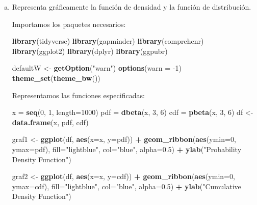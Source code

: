 \documentclass[a4paper]{article}
\newenvironment{Shaded}{\begin{snugshade}}{\end{snugshade}}
\newcommand{\DataTypeTok}[1]{\textcolor[rgb]{0.13,0.29,0.53}{#1}}
\newcommand{\DecValTok}[1]{\textcolor[rgb]{0.00,0.00,0.81}{#1}}
\newcommand{\FloatTok}[1]{\textcolor[rgb]{0.00,0.00,0.81}{#1}}
\newcommand{\KeywordTok}[1]{\textcolor[rgb]{0.13,0.29,0.53}{\textbf{#1}}}
\newcommand{\NormalTok}[1]{#1}
\newcommand{\OperatorTok}[1]{\textcolor[rgb]{0.81,0.36,0.00}{\textbf{#1}}}
\newcommand{\StringTok}[1]{\textcolor[rgb]{0.31,0.60,0.02}{#1}}
\begin{document}
\begin{enumerate}[a)]
	\item Representa gráficamente la función de densidad y la función de distribución.

	Importamos los paquetes necesarios:

\begin{Shaded}
\begin{Highlighting}[]
\KeywordTok{library}\NormalTok{(tidyverse)}
\KeywordTok{library}\NormalTok{(gapminder)}
\KeywordTok{library}\NormalTok{(comprehenr)}
\KeywordTok{library}\NormalTok{(ggplot2)}
\KeywordTok{library}\NormalTok{(dplyr)}
\KeywordTok{library}\NormalTok{(ggpubr)}

\NormalTok{defaultW <-}\StringTok{ }\KeywordTok{getOption}\NormalTok{(}\StringTok{"warn"}\NormalTok{)}
\KeywordTok{options}\NormalTok{(}\DataTypeTok{warn =} \DecValTok{-1}\NormalTok{)}
\KeywordTok{theme_set}\NormalTok{(}\KeywordTok{theme_bw}\NormalTok{())}
\end{Highlighting}
\end{Shaded}

	Representamos las funciones especificadas:

\begin{Shaded}
\begin{Highlighting}[]
\NormalTok{x =}\StringTok{ }\KeywordTok{seq}\NormalTok{(}\DecValTok{0}\NormalTok{, }\DecValTok{1}\NormalTok{, }\DataTypeTok{length=}\DecValTok{1000}\NormalTok{)}
\NormalTok{pdf =}\StringTok{ }\KeywordTok{dbeta}\NormalTok{(x, }\DecValTok{3}\NormalTok{, }\DecValTok{6}\NormalTok{)}
\NormalTok{cdf =}\StringTok{ }\KeywordTok{pbeta}\NormalTok{(x, }\DecValTok{3}\NormalTok{, }\DecValTok{6}\NormalTok{)}
\NormalTok{df <-}\StringTok{ }\KeywordTok{data.frame}\NormalTok{(x, pdf, cdf)}

\NormalTok{graf1 <-}\StringTok{ }\KeywordTok{ggplot}\NormalTok{(df, }\KeywordTok{aes}\NormalTok{(}\DataTypeTok{x=}\NormalTok{x, }\DataTypeTok{y=}\NormalTok{pdf)) }\OperatorTok{+}
\StringTok{  }\KeywordTok{geom_ribbon}\NormalTok{(}\KeywordTok{aes}\NormalTok{(}\DataTypeTok{ymin=}\DecValTok{0}\NormalTok{, }\DataTypeTok{ymax=}\NormalTok{pdf), }\DataTypeTok{fill=}\StringTok{"lightblue"}\NormalTok{, }\DataTypeTok{col=}\StringTok{"blue"}\NormalTok{, }\DataTypeTok{alpha=}\FloatTok{0.5}\NormalTok{) }\OperatorTok{+}
\StringTok{  }\KeywordTok{ylab}\NormalTok{(}\StringTok{"Probability Density Function"}\NormalTok{)}

\NormalTok{graf2 <-}\StringTok{ }\KeywordTok{ggplot}\NormalTok{(df, }\KeywordTok{aes}\NormalTok{(}\DataTypeTok{x=}\NormalTok{x, }\DataTypeTok{y=}\NormalTok{cdf)) }\OperatorTok{+}
\StringTok{  }\KeywordTok{geom_ribbon}\NormalTok{(}\KeywordTok{aes}\NormalTok{(}\DataTypeTok{ymin=}\DecValTok{0}\NormalTok{, }\DataTypeTok{ymax=}\NormalTok{cdf), }\DataTypeTok{fill=}\StringTok{"lightblue"}\NormalTok{, }\DataTypeTok{col=}\StringTok{"blue"}\NormalTok{, }\DataTypeTok{alpha=}\FloatTok{0.5}\NormalTok{) }\OperatorTok{+}
\StringTok{  }\KeywordTok{ylab}\NormalTok{(}\StringTok{"Cumulative Density Function"}\NormalTok{)}


\end{Highlighting}
\end{Shaded}
\end{enumerate}
\end{document}
